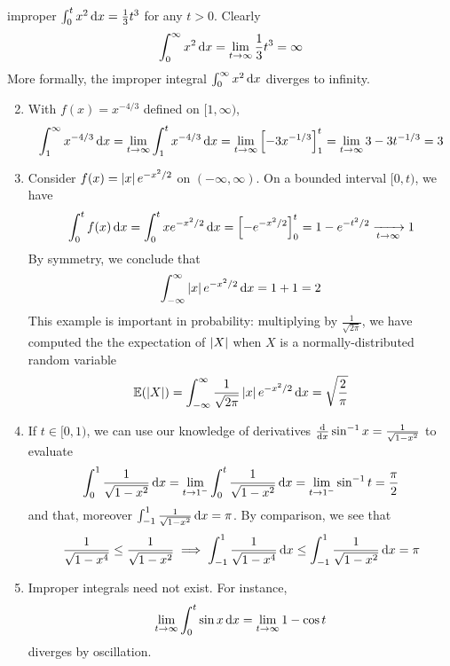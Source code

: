 \vfil\pagebreak

\begin{examples}{}{improper}
\exstart $\int_0^tx^2\,{\mathrm{d} x}=\frac 13t^3$ for any $t>0$. Clearly
\[\int_0^\infty x^2\,{\mathrm{d} x}=\lim\limits_{t\to\infty}\frac 13t^3=\infty\]
More formally, the improper integral $\int_0^\infty x^2\,{\mathrm{d} x}$ diverges to infinity.

\begin{enumerate}\setcounter{enumi}{1}
  \item With $f(x)=x^{-4/3}$ defined on $[1,\infty)$,
  \[\int_1^\infty x^{-4/3}\,{\mathrm{d} x}=\lim_{t\to\infty}\int_1^tx^{-4/3}\,{\mathrm{d} x} =\lim_{t\to\infty}\left[-3x^{-1/3}\right]_1^t =\lim_{t\to\infty}3-3t^{-1/3} =3\]
  
  \item\label{ex:riemannsmotiv} Consider $f(x)=\left| x\right|e^{-x^2/2}$ on $(-\infty,\infty)$. On a bounded interval $[0,t)$, we have
  \[\int_0^tf(x)\,{\mathrm{d} x} =\int_0^txe^{-x^2/2}\,{\mathrm{d} x} =\left[-e^{-x^2/2}\right]_0^t =1-e^{-t^2/2} \xrightarrow[t\to\infty]{} 1\]
  By symmetry, we conclude that
  \[\int_{-\infty}^\infty \left| x\right|e^{-x^2/2}\,{\mathrm{d} x}=1+1=2\]
  This example is important in probability: multiplying by $\frac 1{\sqrt{2\pi}}$, we have computed the the expectation of $\left| X\right|$ when $X$ is a normally-distributed random variable
  \[\mathbb{E}(\left| X\right|)=\int_{-\infty}^\infty \frac 1{\sqrt{2\pi}}\left| x\right|e^{-x^2/2}\,{\mathrm{d} x}=\sqrt{\frac 2\pi}\]
  
  \item If $t\in[0,1)$, we can use our knowledge of derivatives $\frac{\mathrm{d} }{\mathrm{d} x}\sin^{-1}x=\frac 1{\sqrt{1-x^2}}$ to evaluate
  \[\int_0^1\frac 1{\sqrt{1-x^2}}\,{\mathrm{d} x}=\lim_{t\to 1^-}\int_0^t\frac 1{\sqrt{1-x^2}}\,{\mathrm{d} x}=\lim_{t\to 1^-}\sin^{-1}t=\frac\pi 2\]
  and that, moreover $\int_{-1}^1\frac 1{\sqrt{1-x^2}}\,{\mathrm{d} x}=\pi$. By comparison, we see that
  \[\frac 1{\sqrt{1-x^4}}\le \frac 1{\sqrt{1-x^2}}\implies\int_{-1}^1\frac 1{\sqrt{1-x^4}}\,{\mathrm{d} x}\le \int_{-1}^1\frac 1{\sqrt{1-x^2}}\,{\mathrm{d} x}=\pi\]
  
  \item Improper integrals need not exist. For instance,
  \[\lim_{t\to\infty}\int_0^t\sin x\,{\mathrm{d} x}=\lim_{t\to\infty}1-\cos t\]
  diverges by oscillation.
\end{enumerate}
\end{examples}

